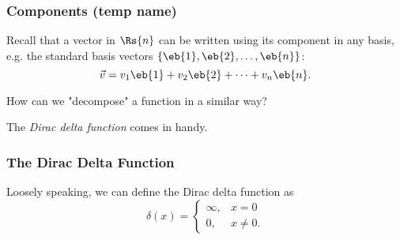 
\begin{frame}
	\frametitle{Components (temp name)}
	Recall that a vector in $\Rs{n}$ can be written using its component in any basis, e.g. the standard basis vectors $\left\{ \eb{1},\eb{2},\dots,\eb{n} \right\}$:
	\begin{equation*}
		\vec{v} = v_{1}\eb{1} + v_{2}\eb{2} + \cdots + v_{n}\eb{n}.
	\end{equation*}

	How can we "decompose" a function in a similar way?

	The \emph{Dirac delta function} comes in handy.
\end{frame}

\begin{frame}
	\frametitle{The Dirac Delta Function}
	Loosely speaking, we can define the Dirac delta function as
	\begin{equation*}
		\delta(x)=
		\begin{cases}
			\infty, & x=0\\
			0, & x\neq0.
		\end{cases}
	\end{equation*}
\end{frame}
